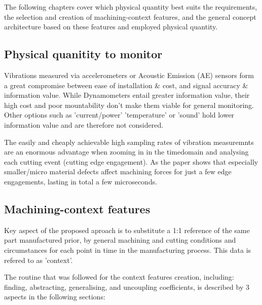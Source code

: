 \documentclass[5p,times,procedia]{elsarticle}
\begin{document}
The following chapters cover which physical quantity best suits the requirements, the selection and creation of machining-context features, and the general concept architecture based on these features and employed physical quantity.


\subsection{Physical quanitity to monitor}
\vspace*{-\baselineskip}
Vibrations measured via accelerometers or Acoustic Emission (AE) sensors form a great compromise between ease of installation \& cost, and signal accuracy \& information value. While Dynamometers entail greater information value, their high cost and poor mountability don't make them viable for general monitoring. Other options such as 'current/power' 'temperature' or 'sound' hold lower information value and are therefore not considered.

The easily and cheaply achievable high sampling rates of vibration measuremnts are an enormous advantage when zooming in in the timedomain and analysing each cutting event (cutting edge engagement). As the paper \cite{Pfirrmann.Baumann.ea2021} shows that especially smaller/micro material defects affect machining forces for just a few edge engagements, lasting in total a few microseconds.

\subsection{Machining-context features}
\vspace*{-\baselineskip}

Key aspect of the proposed aproach is to substitute a 1:1 reference of the same part manufactured prior, by general machining and cutting conditions and circumstances for each point in time in the manufacturing process. This data is refered to as 'context'.

The routine that was followed for the context features creation, including: finding, abstracting, generalising, and uncoupling coefficients, is described by 3 aspects in the following sections:
\end{document}
